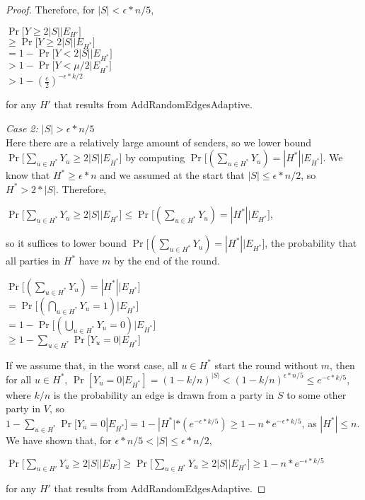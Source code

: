 \documentclass{article}
\begin{document}
\begin{proof}
Therefore, for $|S| < \epsilon * n / 5$, 
\begin{center}
    $\Pr \big [Y \geq 2|S| \big | E_{H'} \big]$ \\
    $ \geq \Pr\big [Y \geq 2|S| \big | E_{H^*}\big ]$ \\ $ = 1 - \Pr\big [Y < 2|S| \big | E_{H^*}] $ \\ $> 1 - \Pr\big [Y < \mu / 2 \big | E_{H^*}\big ]$ \\ $ > 1 - (\frac{e}{2})^{-\epsilon*k/2}$
\end{center}

for any $H'$ that results from AddRandomEdgesAdaptive.

\textit{Case 2: $|S| > \epsilon * n/5$}\\
Here there are a relatively large amount of senders, so we lower bound $\Pr\big [\sum_{u \in {H^*}} Y_u \geq 2|S| \big | E_{H^*}\big ]$ by computing $\Pr\big [(\sum_{u \in {H^*}} Y_u) = |H^*| \big | E_{H^*}\big ]$. We know that $H^* \geq \epsilon * n$ and we assumed at the start that $|S| \leq \epsilon * n / 2$, so $H^* > 2*|S|$. Therefore,
\begin{center}
    $\Pr\big [\sum_{u \in {H^*}} Y_u \geq 2|S| \big | E_{H^*}\big ] \leq \Pr\big [(\sum_{u \in {H^*}} Y_u) = |H^*| \big | E_{H^*}\big ]$,
\end{center}
so it suffices to lower bound $\Pr\big [(\sum_{u \in {H^*}} Y_u) = |H^*| \big | E_{H^*}\big ]$, the probability that all parties in $H^*$ have $m$ by the end of the round. 

\begin{center}
$\Pr\big [(\sum_{u \in {H^*}} Y_u) = |H^*| \big | E_{H^*}\big ] $\\ $= \Pr\big [(\bigcap_{u \in {H^*}} Y_u = 1)\big | E_{H^*}\big ]$ \\$ = 1 - \Pr\big[(\bigcup_{u \in {H^*}} Y_u = 0)\big | E_{H^*}\big ]$ \\ $\geq 1 - \sum_{u \in {H^*}} \Pr\big [Y_u = 0 \big | E_{H^*}\big ]$

\end{center}

If we assume that, in the worst case, all $u \in H^*$ start the round without $m$, then for all $u \in H^*$, $\Pr[Y_u = 0 | E_{H^*}] = (1 - k/n)^{|S|} < (1 - k/n)^{\epsilon * n/5} \leq e^{-\epsilon * k / 5}$, where $k/n$ is the probability an edge is drawn from a party in $S$ to some other party in $V$, so  $1 - \sum_{u \in {H^*}} \Pr[Y_u = 0 | E_{H^*}] = 1 - |H^*| * (e^{-\epsilon * k / 5}) \geq 1 - n * e^{-\epsilon * k / 5}$, as $|H^*| \leq n$. We have shown that, for $ \epsilon * n/5 < |S| \leq \epsilon * n / 2$, 
\begin{center}
    $\Pr\big [\sum_{u \in {H'}} Y_u \geq 2|S| \big | E_{H'}\big ] \geq \Pr\big [\sum_{u \in {H^*}} Y_u \geq 2|S| \big | E_{H^*}\big ] \geq 1 - n * e^{-\epsilon * k / 5}$
\end{center}
for any $H'$ that results from AddRandomEdgesAdaptive.


\end{proof}
\end{document}
